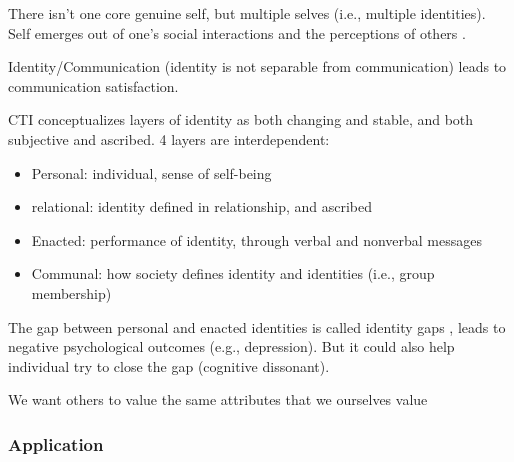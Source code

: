 \documentclass[
]{book}
\providecommand{\tightlist}{%
  \setlength{\itemsep}{0pt}\setlength{\parskip}{0pt}}
\begin{document}
There isn't one core genuine self, but multiple selves (i.e., multiple identities). Self emerges out of one's social
interactions and the perceptions of others \citep{stryker1979}.

Identity/Communication (identity is not separable from communication) leads to communication satisfaction.

CTI conceptualizes layers of identity as both changing and stable, and both subjective and ascribed. 4 layers are
interdependent:

\begin{itemize}
\tightlist
\item
  Personal: individual, sense of self-being
\item
  relational: identity defined in relationship, and ascribed
\item
  Enacted: performance of identity, through verbal and nonverbal messages
\item
  Communal: how society defines identity and identities (i.e., group membership)
\end{itemize}

The gap between personal and enacted identities is called identity gaps \citep{Jung_2004}, leads to negative psychological
outcomes (e.g., depression). But it could also help individual try to close the gap (cognitive dissonant).

We want others to value the same attributes that we ourselves value \citep[pp.~261]{Baxter_2008}

\hypertarget{application}{%
\subsubsection{Application}\label{application}}

\citep{WILLER_2010}
\end{document}
